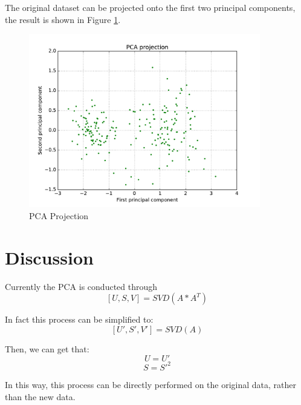 The original dataset can be projected onto the first two principal components, the result is shown in Figure \ref{fig:projection}.
\begin{figure}[H]
\centering
\includegraphics[width=0.9\textwidth]{./figures/projection.pdf}
\caption{\label{fig:projection} PCA Projection}
\end{figure}


\section{\large Discussion}

Currently the PCA is conducted through $$[U, S, V] = SVD(A * A^T)$$

In fact this process can be simplified to: $$[U', S', V'] = SVD(A)$$

Then, we can get that: 
$$U = U'$$
$$S = {S'} ^ 2$$

In this way, this process can be directly performed on the original data, rather than the new data.


\clearpage

%
%
%



